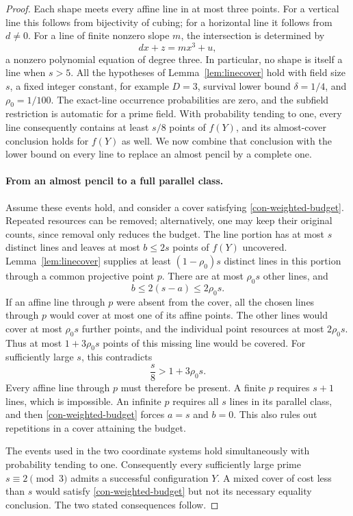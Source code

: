 \begin{proof}
Each shape meets every affine line in at most three points.  For a
vertical line this follows from bijectivity of cubing; for a
horizontal line it follows from \(d\ne0\).  For a line of finite
nonzero slope \(m\), the intersection is determined by
\[
 dx+z=mx^3+u,
\]
a nonzero polynomial equation of degree three.  In particular, no
shape is itself a line when \(s>5\).  All the hypotheses of
Lemma~\ref{lem:linecover} hold with field size \(s\), a fixed
integer constant, for example \(D=3\), survival lower bound
\(\delta=1/4\), and \(\rho_0=1/100\).  The exact-line
occurrence probabilities are zero, and the subfield restriction is
automatic for a prime field.  With probability tending to one, every
line consequently contains at least \(s/8\) points of \(f(Y)\),
and its almost-cover conclusion holds for \(f(Y)\) as well.  We now
combine that conclusion with the lower bound on every line to replace
an almost pencil by a complete one.

\paragraph{From an almost pencil to a full parallel class.}
Assume these events hold, and consider a cover satisfying
\eqref{con-weighted-budget}.  Repeated resources can be removed;
alternatively, one may keep their original counts, since removal
only reduces the budget.  The line portion has at most \(s\)
distinct lines and leaves at most \(b\le2s\) points of \(f(Y)\)
uncovered.  Lemma~\ref{lem:linecover} supplies at least
\((1-\rho_0)s\) distinct lines in this portion through a common
projective point \(p\).  There are at most \(\rho_0s\) other
lines, and
\[
 b\le2(s-a)\le2\rho_0s.
\]
If an affine line through \(p\) were absent from the cover, all the
chosen lines through \(p\) would cover at most one of its affine
points.  The other lines would cover at most \(\rho_0s\) further
points, and the individual point resources at most \(2\rho_0s\).
Thus at most \(1+3\rho_0s\) points of this missing line would be
covered.  For sufficiently large \(s\), this contradicts
\[
 \frac s8>1+3\rho_0s.
\]
Every affine line through \(p\) must therefore be present.  A
finite \(p\) requires \(s+1\) lines, which is impossible.  An
infinite \(p\) requires all \(s\) lines in its parallel class,
and then \eqref{con-weighted-budget} forces \(a=s\) and \(b=0\).
This also rules out repetitions in a cover attaining the budget.

The events used in the two coordinate systems hold simultaneously
with probability tending to one.  Consequently every sufficiently
large prime \(s\equiv2\pmod3\) admits a successful configuration
\(Y\).  A mixed cover of cost less than
\(s\) would satisfy \eqref{con-weighted-budget} but not its
necessary equality conclusion.  The two stated consequences follow.
\end{proof}


